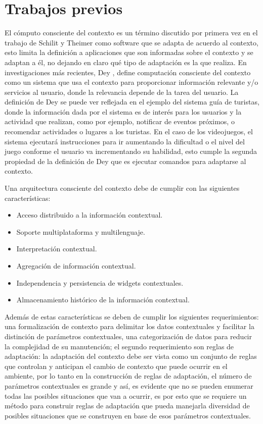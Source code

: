 \section{Trabajos previos}
El c\'omputo consciente del contexto es un t\'ermino discutido por primera vez en el trabajo de Schilit y Theimer \cite{schillit1994disseminating} como software que se adapta de acuerdo al contexto, esto limita la definici\'on a aplicaciones que son informadas sobre el contexto y se adaptan a \'el, no dejando en claro qu\'e tipo de adaptaci\'on es la que realiza. En investigaciones m\'as recientes, Dey \cite{dey2001conceptual}, define computaci\'on consciente del contexto como un sistema que usa el contexto para proporcionar informaci\'on relevante y/o servicios al usuario, donde la relevancia depende de la tarea del usuario. La definici\'on de Dey se puede ver reflejada en el ejemplo del sistema gu\'ia de turistas, donde la informaci\'on dada por el sistema es de inter\'es para los usuarios y la actividad que realizan, como por ejemplo, notificar de eventos pr\'oximos, o recomendar actividades o lugares a los turistas. En el caso de los videojuegos, el sistema ejecutar\'a instrucciones para ir aumentando la dificultad o el nivel del juego conforme el usuario va incrementando su habilidad, esto cumple la segunda propiedad de la definici\'on de Dey que es ejecutar comandos para adaptarse al contexto.

Una arquitectura consciente del contexto debe de cumplir con las siguientes caracter\'isticas\cite{dey1999architecture}:

\begin{itemize}
\item Acceso distribuido a la informaci\'on contextual.
\item Soporte multiplataforma y multilenguaje.
\item Interpretaci\'on contextual.
\item Agregaci\'on de informaci\'on contextual.
\item Independencia y persistencia de widgets contextuales.
\item Almacenamiento hist\'orico de la informaci\'on contextual.
\end{itemize}

Adem\'as de estas caracter\'isticas se deben de cumplir los siguientes requerimientos\cite{el2011distributed}: una formalizaci\'on de contexto para delimitar los datos contextuales  y facilitar la distinci\'on  de par\'ametros contextuales, una categorizaci\'on de datos para reducir la complejidad de su manutenci\'on; el segundo requerimiento son reglas de adaptaci\'on: la adaptaci\'on del contexto debe ser vista como un conjunto de reglas que controlan y anticipan el cambio de contexto que puede ocurrir en el ambiente, por lo tanto en la construcci\'on de reglas de adaptaci\'on, el n\'umero de par\'ametros contextuales es grande y as\'i, es evidente que no se pueden enumerar todas las posibles situaciones que van a ocurrir, es por esto que se requiere un m\'etodo para construir reglas de adaptaci\'on que pueda manejarla diversidad de posibles situaciones que se construyen en base de esos par\'ametros contextuales.

